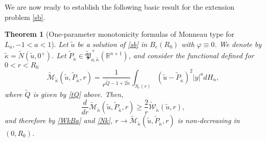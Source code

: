 \documentclass[11pt]{amsart}
\theoremstyle{plain}
\newtheorem{thrm}{Theorem}[section]
\numberwithin{equation}{section}
\begin{document}
We are now ready to establish the following basic result for the extension problem \eqref{sb}.

\begin{thrm}[One-parameter monotonicity formulas of Monneau type for $L_a, -1<a<1$]\label{T:monneauext}
Let $\tilde u$ be a solution of \eqref{sb} in $B_e(R_0)$ with ${\varphi}\equiv 0$. We denote by $\tilde \kappa = \tilde N(\tilde u,0^+)$. Let $\tilde P_{\tilde \kappa}\in \tilde{\mathfrak P}^+_{a,\tilde \kappa}({\mathbb R}^{n+1})$,  and consider the functional defined for $0<r<R_0$
\begin{equation}\label{Me}
\tilde{\mathcal M}_{\tilde \kappa}(\tilde u,\tilde P_{\tilde \kappa},r) = \frac{1}{r^{\tilde Q-1+2\tilde \kappa}} \int_{{S_{e}(r)}} (\tilde u - \tilde P_{\tilde \kappa})^2 |y|^a dH_{n},
\end{equation}
where $\tilde Q$ is given by  \eqref{tQ} above. Then,
\begin{equation}\label{M'e}
\frac{d}{dr} \tilde{\mathcal M}_{\tilde \kappa}(\tilde u,\tilde P_{\tilde \kappa},r)  \ge \frac{2}{r} \tilde{\mathcal W}_{\tilde \kappa}(\tilde u,r),
\end{equation}
and therefore by \eqref{WkBa} and \eqref{Nk}, $r \to  \tilde{\mathcal M}_{\tilde \kappa}(\tilde u,\tilde P_{\tilde \kappa},r)$ is non-decreasing in $(0,R_0)$.
\end{thrm}
\end{document}
